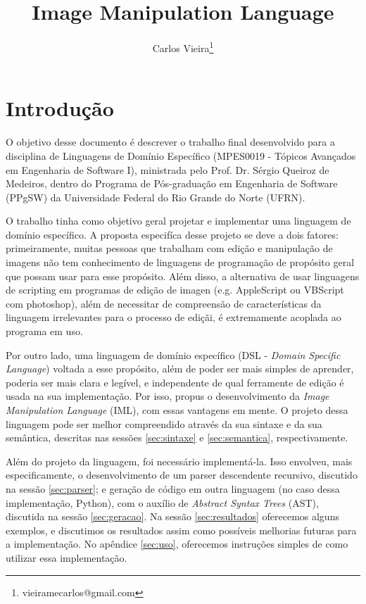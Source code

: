 \documentclass{article}
\title{Image Manipulation Language}
\author{Carlos Vieira\thanks{vieiramecarlos@gmail.com}}
\begin{document}
\maketitle

\section{Introdução}
O objetivo desse documento é descrever o trabalho final desenvolvido para a disciplina de Linguagens de Domínio Específico (MPES0019 - Tópicos Avançados em Engenharia de Software I), ministrada pelo Prof. Dr. Sérgio Queiroz de Medeiros, dentro do Programa de Pós-graduação em Engenharia de Software (PPgSW) da Universidade Federal do Rio Grande do Norte (UFRN).

O trabalho tinha como objetivo geral projetar e implementar uma linguagem de domínio específico. A proposta especifíca desse projeto se deve a dois fatores: primeiramente, muitas pessoas que trabalham com edição e manipulação de imagens não tem conhecimento de linguagens de programação de propósito geral que possam usar para esse propósito. Além disso, a alternativa de usar linguagens de scripting em programas de edição de imagen (e.g. AppleScript ou VBScript com photoshop), além de necessitar de compreensão de características da linguagem irrelevantes para o processo de ediçãi, é extremamente acoplada ao programa em uso.

Por outro lado, uma linguagem de domínio específico (DSL - \emph{Domain Specific Language}) voltada a esse propósito, além de poder ser mais simples de aprender, poderia ser mais clara e legível, e independente de qual ferramente de edição é usada na sua implementação. Por isso, propus o desenvolvimento da \emph{Image Manipulation Language} (IML), com essas vantagens em mente. O projeto dessa linguagem pode ser melhor compreendido através da sua sintaxe e da sua semântica, descritas nas sessões \ref{sec:sintaxe} e \ref{sec:semantica}, respectivamente.

Além do projeto da linguagem, foi necessário implementá-la. Isso envolveu, mais especificamente, o desenvolvimento de um parser descendente recursivo, discutido na sessão \ref{sec:parser}; e geração de código em outra linguagem (no caso dessa implementação, Python), com o auxílio de \textit{Abstract Syntax Trees} (AST), discutida na sessão \ref{sec:geracao}. Na sessão \ref{sec:resultados} oferecemos alguns exemplos, e discutimos os resultados assim como possíveis melhorias futuras para a implementação. No apêndice \ref{sec:uso}, oferecemos instruções simples de como utilizar essa implementação.
\end{document}
